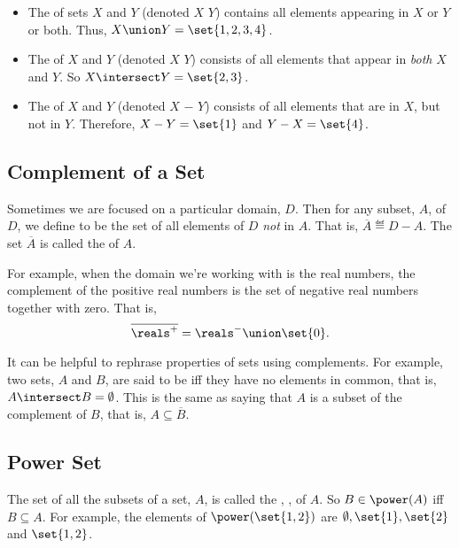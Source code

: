 \begin{itemize}

\item The  of sets $X$ and $Y$ (denoted $X$ \term{$\union$} $Y$)
contains all elements appearing in $X$ or $Y$ or both.  Thus, $X \union
Y = \set{1, 2, 3, 4}$.

\item The  of $X$ and $Y$ (denoted $X$
  \term{$\intersect$} $Y$) consists of all elements that appear in
  \textit{both} $X$ and $Y$.  So $X \intersect Y = \set{2, 3}$.

\item The  of $X$ and $Y$ (denoted $X$ $-$ $Y$) consists of all elements that are in $X$, but not in $Y$.
  Therefore, $X - Y = \set{1}$ and $Y - X = \set{4}$.

\end{itemize}

\subsection{Complement of a Set}

Sometimes we are focused on a particular domain, $D$.  Then for any
subset, $A$, of $D$, we define  to be the set of all
elements of $D$ \textit{not} in $A$.  That is, $\overline{A} \eqdef D-A$.
The set $\overline{A}$ is called the  of $A$.

For example, when the domain we're working with is the real numbers,
the complement of the positive real numbers is the set of negative real
numbers together with zero.  That is,
\[
\overline{\reals^+} = \reals^- \union \set{0}.
\]

It can be helpful to rephrase properties of sets using complements.  For
example, two sets, $A$ and $B$, are said to be  iff they
have no elements in common, that is, $A \intersect B = \emptyset$.  This
is the same as saying that $A$ is a subset of the complement of $B$, that
is, $A \subseteq \overline{B}$.

\subsection{Power Set}

The set of all the subsets of a set, $A$, is called the , , of $A$.  So $B \in \power(A)$ iff $B
\subseteq A$.  For example, the elements of $\power( \set{1, 2})$ are
$\emptyset, \set{1}, \set{2}$ and $\set{1, 2}$.

